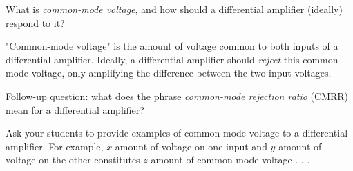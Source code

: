 

What is {\it common-mode voltage}, and how should a differential amplifier (ideally) respond to it?







"Common-mode voltage" is the amount of voltage common to both inputs of a differential amplifier.  Ideally, a differential amplifier should {\it reject} this common-mode voltage, only amplifying the difference between the two input voltages.

\vskip 10pt

Follow-up question: what does the phrase {\it common-mode rejection ratio} (CMRR) mean for a differential amplifier?







Ask your students to provide examples of common-mode voltage to a differential amplifier.  For example, $x$ amount of voltage on one input and $y$ amount of voltage on the other constitutes $z$ amount of common-mode voltage . . .




